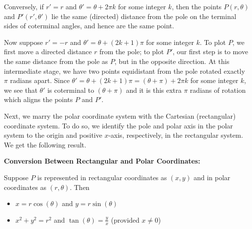 \documentclass{ximera}
\begin{document}
   
  
  Conversely, if $r' = r$ and $\theta' =  \theta + 2\pi k$ for some integer $k$, then  the points $P\left(r, \theta\right)$ and $P'\left(r', \theta'\right)$ lie the same (directed) distance from the pole on the terminal sides of coterminal angles, and hence are the same point.  
  
   
  
Now suppose  $r' = -r$ and $\theta' = \theta + (2k + 1) \pi$ for some integer $k$.  To plot $P$, we first move a directed distance $r$ from the pole;  to plot $P'$, our first step is to move the same distance from the pole as $P$, but in the opposite direction.  At this intermediate stage, we have two points equidistant from the pole rotated exactly $\pi$ radians apart.  Since  $\theta' =  \theta + (2k + 1) \pi = \left(\theta + \pi\right) + 2\pi k $ for some integer $k$,  we see that $\theta'$ is coterminal to $\left(\theta + \pi\right)$ and it is this extra $\pi$ radians of rotation which aligns the points $P$ and $P'$.

 

Next, we marry the polar coordinate system with the Cartesian (rectangular) coordinate system.  To do so, we identify the pole and polar axis in the polar system to the origin and positive $x$-axis, respectively, in the rectangular system.  We get the following result.

 


\begin{theorem} \label{polarrectangularconversion} \textbf{Conversion Between Rectangular and Polar Coordinates:}  $~$

Suppose $P$ is represented in rectangular coordinates as $(x,y)$ and in polar coordinates as $(r,\theta)$.  Then

\begin{itemize}

\item $x = r \cos(\theta)$ and $y = r\sin(\theta)$ 

\item $x^2+y^2 = r^2$ and $\tan(\theta) = \frac{y}{x}$ (provided $x \neq 0$) 

\end{itemize}

 

\end{theorem}
\end{document}
